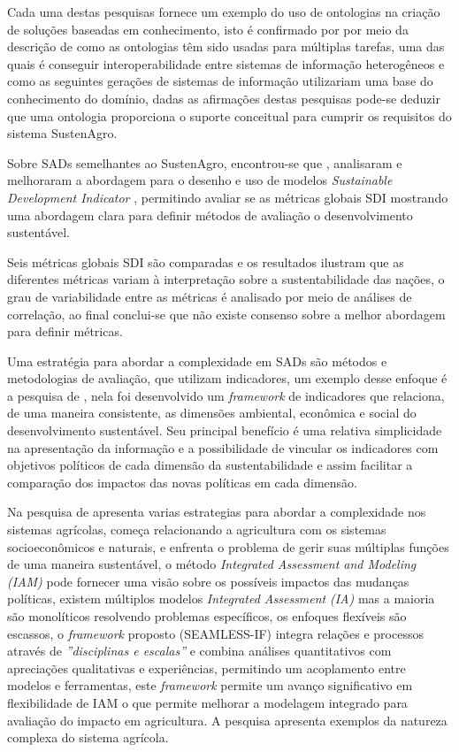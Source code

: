 Cada uma destas pesquisas fornece um exemplo do uso de ontologias
na criação de soluções baseadas em conhecimento, isto é confirmado
por \citet{roussey2010ontologies} por meio da descrição de como as
ontologias têm sido usadas para múltiplas tarefas, uma das quais é
conseguir interoperabilidade entre sistemas de informação heterogêneos
e como as seguintes gerações de sistemas de informação utilizariam
uma base do conhecimento do domínio, dadas as afirmações destas pesquisas
pode-se deduzir que uma ontologia proporciona o suporte conceitual
para cumprir os requisitos do sistema SustenAgro.

Sobre SADs semelhantes ao SustenAgro, encontrou-se que \citet{Wilson2007299},
analisaram e melhoraram a abordagem para o desenho e uso de modelos\emph{
}\foreignlanguage{english}{\emph{Sustainable Development Indicator}}
\emph{}, permitindo
avaliar se as métricas globais SDI mostrando uma abordagem clara para
definir métodos de avaliação o desenvolvimento sustentável. 

Seis métricas globais SDI são comparadas e os resultados ilustram
que as diferentes métricas variam à interpretação sobre a sustentabilidade
das nações, o grau de variabilidade entre as métricas é analisado
por meio de análises de correlação, ao final conclui-se que não existe
consenso sobre a melhor abordagem para definir métricas.

Uma estratégia para abordar a complexidade em SADs são métodos e metodologias
de avaliação, que utilizam indicadores, um exemplo desse enfoque é
a pesquisa de \citet{AlkanOlsson:2009}, nela foi desenvolvido um
\foreignlanguage{english}{\emph{framework}} de indicadores que relaciona,
de uma maneira consistente, as dimensões ambiental, econômica e social
do desenvolvimento sustentável. Seu principal benefício é uma relativa
simplicidade na apresentação da informação e a possibilidade de vincular
os indicadores com objetivos políticos de cada dimensão da sustentabilidade
e assim facilitar a comparação dos impactos das novas políticas em
cada dimensão.

Na pesquisa de \citet{Ewert2009546} apresenta varias estrategias
para abordar a complexidade nos sistemas agrícolas, começa relacionando
a agricultura com os sistemas socioeconômicos e naturais, e enfrenta
o problema de gerir suas múltiplas funções de uma maneira sustentável,
o método \foreignlanguage{english}{\emph{Integrated Assessment and
Modeling}}\emph{ (IAM)} pode fornecer uma visão sobre os possíveis
impactos das mudanças políticas, existem múltiplos modelos \foreignlanguage{english}{\emph{Integrated
Assessment}}\emph{ (IA)} mas a maioria são monolíticos resolvendo
problemas específicos, os enfoques flexíveis são escassos, o \emph{framework}
proposto (SEAMLESS-IF) integra relações e processos através de \emph{''disciplinas
e escalas''} e combina análises quantitativos com apreciações qualitativas
e experiências, permitindo um acoplamento entre modelos e ferramentas,
este \emph{framework} permite um avanço significativo em flexibilidade
de IAM o que permite melhorar a modelagem integrado para avaliação
do impacto em agricultura. A pesquisa apresenta exemplos da natureza
complexa do sistema agrícola.

